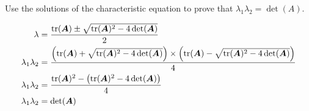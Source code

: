 Use the solutions of the characteristic equation to prove that $\lambda_1 \lambda_2 = \det(A)$.

\begin{solution}
    \begin{align*}
        \lambda &= \frac{\operatorname{tr}(\boldsymbol{A}) \pm \sqrt{\operatorname{tr}(\boldsymbol{A})^2 - 4\det(\boldsymbol{A})}}{2} \\
        \lambda_1 \lambda_2 &= \frac{\left(\operatorname{tr}(\boldsymbol{A}) + \sqrt{\operatorname{tr}(\boldsymbol{A})^2 - 4\det(\boldsymbol{A})}\right) \times \left(\operatorname{tr}(\boldsymbol{A}) - \sqrt{\operatorname{tr}(\boldsymbol{A})^2 - 4\det(\boldsymbol{A})}\right)}{4} \\
        \lambda_1 \lambda_2 &= \frac{\operatorname{tr}(\boldsymbol{A})^2 - \left(\operatorname{tr}(\boldsymbol{A})^2 - 4\det(\boldsymbol{A})\right)}{4} \\
        \lambda_1 \lambda_2 &= \det(\boldsymbol{A}) \\
    \end{align*}
\end{solution}